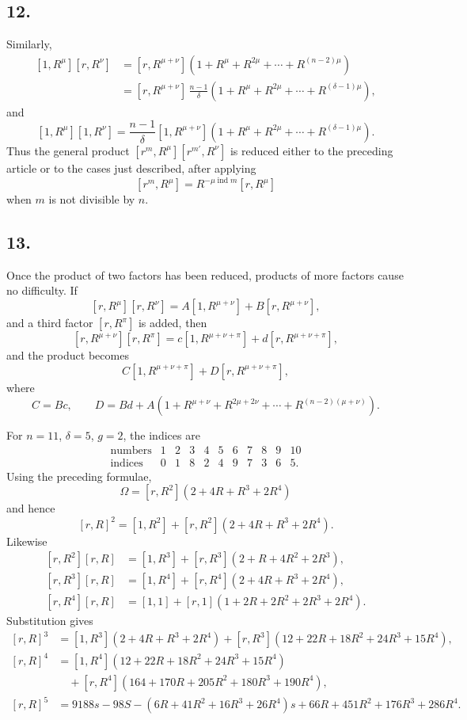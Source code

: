 \documentclass[12pt]{article}
\begin{document}
\subsection*{12.}

Similarly,
\[
\begin{aligned}
[1,R^\mu][r,R^\nu]
&=[r,R^{\mu+\nu}](1+R^\mu+R^{2\mu}+\cdots+R^{(n-2)\mu})\\
&=[r,R^{\mu+\nu}]\,\frac{n-1}{\delta}(1+R^\mu+R^{2\mu}+\cdots+R^{(\delta-1)\mu}),
\end{aligned}
\]
and
\[
[1,R^\mu][1,R^\nu]
=\frac{n-1}{\delta}[1,R^{\mu+\nu}](1+R^\mu+R^{2\mu}+\cdots+R^{(\delta-1)\mu}).
\]
Thus the general product $[r^m,R^\mu][r^{m'},R^\nu]$ is reduced either to the preceding article or to the cases just described, after applying
\[
[r^m,R^\mu]=R^{-\mu\operatorname{ind}m}[r,R^\mu]
\]
when $m$ is not divisible by $n$.

\subsection*{13.}

Once the product of two factors has been reduced, products of more factors cause no difficulty. If
\[
[r,R^\mu][r,R^\nu]=A[1,R^{\mu+\nu}]+B[r,R^{\mu+\nu}],
\]
and a third factor $[r,R^\pi]$ is added, then
\[
[r,R^{\mu+\nu}][r,R^\pi]=c[1,R^{\mu+\nu+\pi}]+d[r,R^{\mu+\nu+\pi}],
\]
and the product becomes
\[
C[1,R^{\mu+\nu+\pi}]+D[r,R^{\mu+\nu+\pi}],
\]
where
\[
C=Bc,\qquad
D=Bd+A(1+R^{\mu+\nu}+R^{2\mu+2\nu}+\cdots+R^{(n-2)(\mu+\nu)}).
\]

For $n=11$, $\delta=5$, $g=2$, the indices are
\[
\begin{array}{c|cccccccccc}
\text{numbers}&1&2&3&4&5&6&7&8&9&10\\
\text{indices}&0&1&8&2&4&9&7&3&6&5.
\end{array}
\]
Using the preceding formulae,
\[
\Omega=[r,R^2](2+4R+R^3+2R^4)
\]
and hence
\[
[r,R]^2=[1,R^2]+[r,R^2](2+4R+R^3+2R^4).
\]
Likewise
\[
\begin{aligned}
[r,R^2][r,R]&=[1,R^3]+[r,R^3](2+R+4R^2+2R^3),\\
[r,R^3][r,R]&=[1,R^4]+[r,R^4](2+4R+R^3+2R^4),\\
[r,R^4][r,R]&=[1,1]+[r,1](1+2R+2R^2+2R^3+2R^4).
\end{aligned}
\]
Substitution gives
\[
\begin{aligned}
[r,R]^3&=[1,R^3](2+4R+R^3+2R^4)
+[r,R^3](12+22R+18R^2+24R^3+15R^4),\\
[r,R]^4&=[1,R^4](12+22R+18R^2+24R^3+15R^4)\\
&\quad+[r,R^4](164+170R+205R^2+180R^3+190R^4),\\
[r,R]^5&=9188s-98S-(6R+41R^2+16R^3+26R^4)s
+66R+451R^2+176R^3+286R^4.
\end{aligned}
\]
\end{document}
